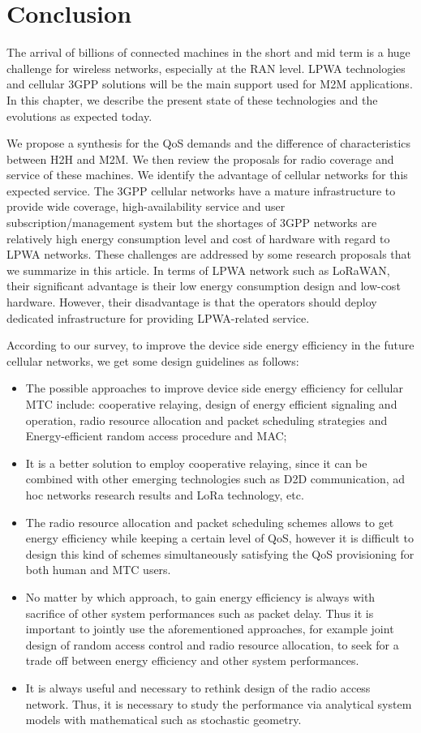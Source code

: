 \section{Conclusion}
\label{sec:overview-conclusion}
The arrival of billions of connected machines in the short and mid term is a huge challenge for wireless networks, especially at the RAN level. LPWA technologies and cellular 3GPP solutions will be the main support used for M2M applications. In this chapter, we describe the present state of these technologies and the evolutions as expected today.

We propose a synthesis for the QoS demands and the difference of characteristics between H2H and M2M. We then review the proposals for radio coverage and service of these machines. We identify the advantage of cellular networks for this expected service. The 3GPP cellular networks have a mature infrastructure to provide wide coverage, high-availability service and user subscription/management system but the shortages of 3GPP networks are relatively high energy consumption level and cost of hardware with regard to LPWA networks. These challenges are addressed by some research proposals that we summarize in this article. In terms of LPWA network such as LoRaWAN, their significant advantage is their low energy consumption design and low-cost hardware. However, their disadvantage is that the operators should deploy dedicated infrastructure for providing LPWA-related service. 

According to our survey, to improve the device side energy efficiency in the future cellular networks, we get some design guidelines as follows: \begin{itemize}[leftmargin=*, noitemsep]
	\item The possible approaches to improve device side energy efficiency for cellular MTC include: cooperative relaying, design of energy efficient signaling and operation, radio resource allocation and packet scheduling strategies and Energy-efficient random access procedure and MAC;
	\item It is a better solution to employ cooperative relaying, since it can be combined with other emerging technologies such as D2D communication, ad hoc networks research results and LoRa technology, etc.
	\item The radio resource allocation and packet scheduling schemes allows to get energy efficiency while keeping a certain level of QoS, however it is difficult to design this kind of schemes simultaneously satisfying the QoS provisioning for both human and MTC users.  
	\item No matter by which approach, to gain energy efficiency is always with sacrifice of other system performances such as packet delay. Thus it is important to jointly use the aforementioned approaches, for example joint design of random access control and radio resource allocation, to seek for a trade off between energy efficiency and other system performances.
	\item It is always useful and necessary to rethink design of the radio access network. Thus, it is necessary to study the performance via analytical system models with mathematical such as stochastic geometry.
\end{itemize}